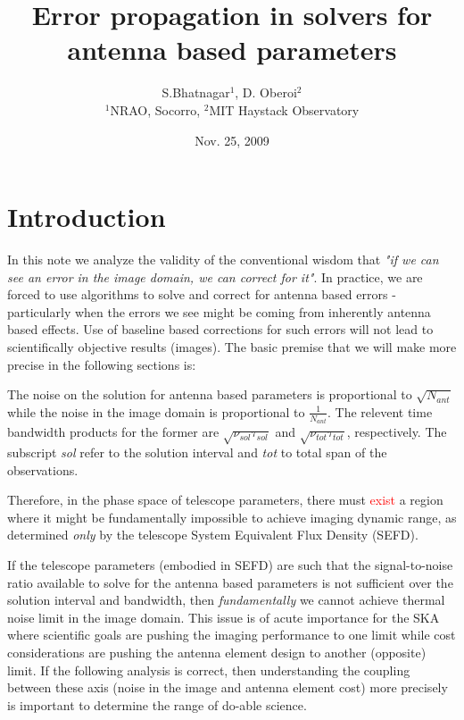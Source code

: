 \documentclass[11pt]{article}
\begin{document}
\title{Error propagation in solvers for antenna based parameters}
\author{S.Bhatnagar$^{1}$, D. Oberoi$^{2}$\\ $^{1}$NRAO, Socorro, $^{2}$MIT Haystack Observatory}
\date{Nov. 25, 2009}
\maketitle
\normalsize



\section{Introduction}

In this note we analyze the validity of the conventional wisdom that
{\it "if we can see an error in the image domain, we can correct for
  it"}.  In practice, we are forced to use algorithms to solve and
correct for antenna based errors - particularly when the errors we see
might be coming from inherently antenna based effects. Use of baseline
based corrections for such errors will not lead to scientifically
objective results (images).  %
The basic premise that we will make more precise in the following
sections is:
\begin{description}
\item The noise on the solution for antenna based parameters is
  proportional to $\sqrt{N_{ant}}$ while the noise in the
  image domain is proportional to $\frac{1}{N_{ant}}$.
  The relevent time bandwidth products for the former are $\sqrt{\nu_{sol} \tau_{sol}}$ and $\sqrt{\nu_{tot} \tau_{tot}}$, respectively.
  The subscript {\em sol} refer to the solution interval and {\em tot} to total span of the observations.
\item Therefore, in the phase space of telescope parameters, there must \textcolor{red}{exist} a
  region where it might be fundamentally impossible to achieve imaging
  dynamic range, as determined {\it only} by the telescope System
  Equivalent Flux Density (SEFD).
\item 
\end{description}

If the telescope parameters (embodied in SEFD) are such that the
signal-to-noise ratio available to solve for the antenna based
parameters is not sufficient over the solution interval and bandwidth,
then {\it fundamentally} we cannot achieve thermal noise limit in the
image domain.  %
This issue is of acute importance for the SKA where scientific goals
are pushing the imaging performance to one limit while cost
considerations are pushing the antenna element design to another
(opposite) limit.  If the following analysis is correct, then
understanding the coupling between these axis (noise in the image and
antenna element cost) more precisely is important to determine the
range of do-able science.
\end{document}
